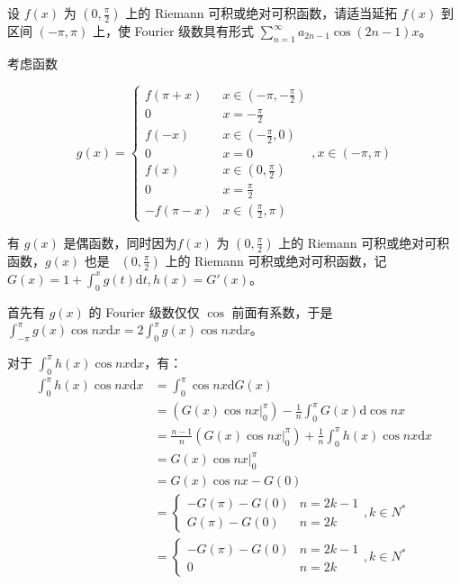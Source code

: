 \begin{ques}
	设 $\displaystyle f( x)$ 为 $\displaystyle \left( 0,\frac{\pi }{2}\right)$ 上的 Riemann 可积或绝对可积函数，请适当延拓 $\displaystyle f( x)$ 到区间 $\displaystyle ( -\pi ,\pi )$ 上，使 Fourier 级数具有形式 $\displaystyle \sum _{n=1}^{\infty } a_{2n-1}\cos( 2n-1) x$。
\end{ques}



考虑函数


\begin{equation*}
	g( x) =\begin{cases}
		f( \pi +x) & x\in \left( -\pi ,-\frac{\pi }{2}\right)\\
		0 & x=-\frac{\pi }{2}\\
		f( -x) & x\in \left( -\frac{\pi }{2} ,0\right)\\
		0 & x=0\\
		f( x) & x\in \left( 0,\frac{\pi }{2}\right)\\
		0 & x=\frac{\pi }{2}\\
		-f( \pi -x) & x\in \left(\frac{\pi }{2} ,\pi \right)
	\end{cases} ,x\in ( -\pi ,\pi )
\end{equation*}


有 $\displaystyle g( x)$ 是偶函数，同时因为$\displaystyle f( x)$ 为 $\displaystyle \left( 0,\frac{\pi }{2}\right)$ 上的 Riemann 可积或绝对可积函数，$\displaystyle g( x)$ 也是 \ $\displaystyle \left( 0,\frac{\pi }{2}\right)$ 上的 Riemann 可积或绝对可积函数，记 $\displaystyle G( x) =1+\int _{0}^{x} g( t)\mathrm{d} t,h( x) =G'( x)$。

首先有 $\displaystyle g( x)$ 的 Fourier 级数仅仅 $\displaystyle \cos$ 前面有系数，于是 $\displaystyle \int _{-\pi }^{\pi } g( x)\cos nx\mathrm{d} x=2\int _{0}^{\pi } g( x)\cos nx\mathrm{d} x$。

对于 $\displaystyle \int _{0}^{\pi } h( x)\cos nx\mathrm{d} x$，有：
\begin{align*}
	\int _{0}^{\pi } h( x)\cos nx\mathrm{d} x & =\int _{0}^{\pi }\cos nx\mathrm{d} G( x)\\
	& =( G( x)\cos nx | _{0}^{\pi }) -\frac{1}{n}\int _{0}^{\pi } G( x)\mathrm{d}\cos nx\\
	& =\frac{n-1}{n}( G( x)\cos nx | _{0}^{\pi }) +\frac{1}{n}\int _{0}^{\pi } h( x)\cos nx\mathrm{d} x\\
	& =G( x)\cos nx | _{0}^{\pi }\\
	& =G( x)\cos nx-G( 0)\\
	& =\begin{cases}
		-G( \pi ) -G( 0) & n=2k-1\\
		G( \pi ) -G( 0) & n=2k
	\end{cases} ,k\in N^{*}\\
	& =\begin{cases}
		-G( \pi ) -G( 0) & n=2k-1\\
		0 & n=2k
	\end{cases} ,k\in N^{*}
\end{align*}



